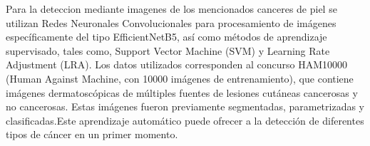 Para la deteccion mediante imagenes de los mencionados canceres de piel se utilizan Redes Neuronales Convolucionales para procesamiento de imágenes 
específicamente del tipo EfficientNetB5, así como métodos de aprendizaje supervisado, tales como, Support Vector Machine (SVM) y Learning Rate Adjustment
(LRA). Los datos utilizados corresponden al concurso HAM10000 (Human Against Machine, con 10000 imágenes de entrenamiento), que contiene imágenes 
dermatoscópicas de múltiples fuentes de lesiones cutáneas cancerosas y no cancerosas. Estas imágenes fueron previamente segmentadas, parametrizadas y 
clasificadas.Este aprendizaje automático puede ofrecer a la detección de diferentes tipos de cáncer en un primer momento. 
